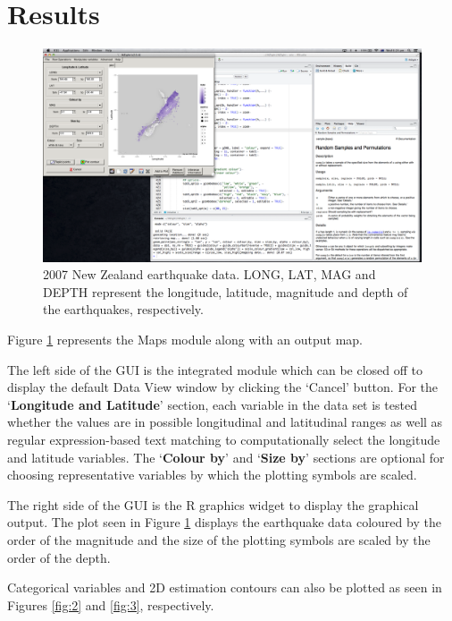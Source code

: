 \documentclass[a4paper, 12pt]{article}
\begin{document}
\section{Results}

\begin{figure}[H]
	\centering
	\includegraphics[trim=0cm 15.32cm 37cm 0.72cm, clip, width=1\textwidth]{demo1}
	\caption{2007 New Zealand earthquake data. LONG, LAT, MAG and DEPTH represent the longitude, latitude, magnitude and depth of the earthquakes, respectively.}
	\label{fig:1}
\end{figure}

Figure \ref{fig:1} represents the Maps module along with an output map.

The left side of the GUI is the integrated module which can be closed off to display the default Data View window by clicking the `Cancel' button. For the `\textbf{Longitude and Latitude}' section, each variable in the data set is tested whether the values are in possible longitudinal and latitudinal ranges as well as regular expression-based text matching to computationally select the longitude and latitude variables. The `\textbf{Colour by}' and `\textbf{Size by}' sections are optional for choosing representative variables by which the plotting symbols are scaled.

The right side of the GUI is the R graphics widget to display the graphical output. The plot seen in Figure \ref{fig:1} displays the earthquake data coloured by the order of the magnitude and the size of the plotting symbols are scaled by the order of the depth.

Categorical variables and 2D estimation contours can also be plotted as seen in Figures \ref{fig:2} and \ref{fig:3}, respectively.
\end{document}

